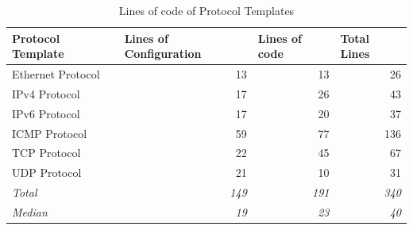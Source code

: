\begin{table}[htb]
    \caption{Lines of code of Protocol Templates}
    \begin{center}
        \begin{tabular}{|l|r|r|r|}
            \hline
            \textbf{Protocol Template} & \multicolumn{1}{l|}{\textbf{Lines of Configuration}} & \multicolumn{1}{l|}{\textbf{Lines of code}} & \multicolumn{1}{l|}{\textbf{Total Lines}} \\ \hline
            Ethernet Protocol          & 13                                                   & 13                                          & 26                                        \\ \hline
            IPv4 Protocol              & 17                                                   & 26                                          & 43                                        \\ \hline
            IPv6 Protocol              & 17                                                   & 20                                          & 37                                        \\ \hline
            ICMP Protocol\footnotemark & 59                                                   & 77                                          & 136                                       \\ \hline
            TCP Protocol               & 22                                                   & 45                                          & 67                                        \\ \hline
            UDP Protocol               & 21                                                   & 10                                          & 31                                        \\ \hline
            \textit{Total}             & \textit{149}                                         & \textit{191}                                & \textit{340}                              \\ \hline
            \textit{Median}            & \textit{19}                                          & \textit{23}                                 & \textit{40}                               \\ \hline
        \end{tabular}%
    \end{center}
    \label{tab:lines_by_protocol_template}
\end{table}

